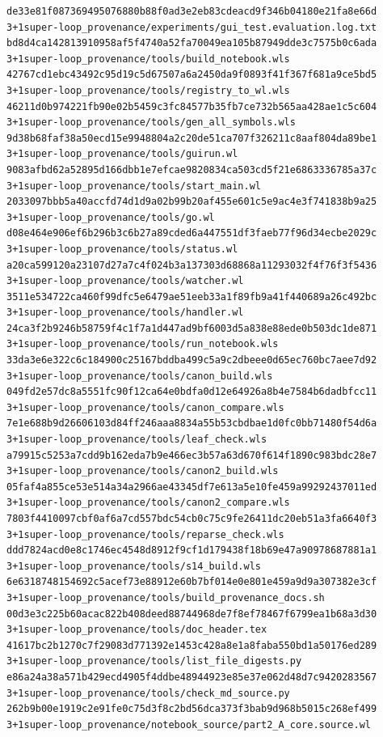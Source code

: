 \documentclass[
  10pt,
]{article}
\begin{document}
\begin{verbatim}
de33e81f087369495076880b88f0ad3e2eb83cdeacd9f346b04180e21fa8e66d  3+1super-loop_provenance/experiments/gui_test.evaluation.log.txt
bd8d4ca142813910958af5f4740a52fa70049ea105b87949dde3c7575b0c6ada  3+1super-loop_provenance/tools/build_notebook.wls
42767cd1ebc43492c95d19c5d67507a6a2450da9f0893f41f367f681a9ce5bd5  3+1super-loop_provenance/tools/registry_to_wl.wls
46211d0b974221fb90e02b5459c3fc84577b35fb7ce732b565aa428ae1c5c604  3+1super-loop_provenance/tools/gen_all_symbols.wls
9d38b68faf38a50ecd15e9948804a2c20de51ca707f326211c8aaf804da89be1  3+1super-loop_provenance/tools/guirun.wl
9083afbd62a52895d166dbb1e7efcae9820834ca503cd5f21e6863336785a37c  3+1super-loop_provenance/tools/start_main.wl
2033097bbb5a40accfd74d1d9a02b99b20af455e601c5e9ac4e3f741838b9a25  3+1super-loop_provenance/tools/go.wl
d08e464e906ef6b296b3c6b27a89cded6a447551df3faeb77f96d34ecbe2029c  3+1super-loop_provenance/tools/status.wl
a20ca599120a23107d27a7c4f024b3a137303d68868a11293032f4f76f3f5436  3+1super-loop_provenance/tools/watcher.wl
3511e534722ca460f99dfc5e6479ae51eeb33a1f89fb9a41f440689a26c492bc  3+1super-loop_provenance/tools/handler.wl
24ca3f2b9246b58759f4c1f7a1d447ad9bf6003d5a838e88ede0b503dc1de871  3+1super-loop_provenance/tools/run_notebook.wls
33da3e6e322c6c184900c25167bddba499c5a9c2dbeee0d65ec760bc7aee7d92  3+1super-loop_provenance/tools/canon_build.wls
049fd2e57dc8a5551fc90f12ca64e0bdfa0d12e64926a8b4e7584b6dadbfcc11  3+1super-loop_provenance/tools/canon_compare.wls
7e1e688b9d26606103d84ff246aaa8834a55b53cbdbae1d0fc0bb71480f54d6a  3+1super-loop_provenance/tools/leaf_check.wls
a79915c5253a7cdd9b162eda7b9e466ec3b57a63d670f614f1890c983bdc28e7  3+1super-loop_provenance/tools/canon2_build.wls
05faf4a855ce53e514a34a2966ae43345df7e613a5e10fe459a99292437011ed  3+1super-loop_provenance/tools/canon2_compare.wls
7803f4410097cbf0af6a7cd557bdc54cb0c75c9fe26411dc20eb51a3fa6640f3  3+1super-loop_provenance/tools/reparse_check.wls
ddd7824acd0e8c1746ec4548d8912f9cf1d179438f18b69e47a90978687881a1  3+1super-loop_provenance/tools/s14_build.wls
6e6318748154692c5acef73e88912e60b7bf014e0e801e459a9d9a307382e3cf  3+1super-loop_provenance/tools/build_provenance_docs.sh
00d3e3c225b60acac822b408deed88744968de7f8ef78467f6799ea1b68a3d30  3+1super-loop_provenance/tools/doc_header.tex
41617bc2b1270c7f29083d771392e1453c428a8e1a8faba550bd1a50176ed289  3+1super-loop_provenance/tools/list_file_digests.py
e86a24a38a571b429ecd4905f4ddbe48944923e85e37e062d48d7c9420283567  3+1super-loop_provenance/tools/check_md_source.py
262b9b00e1919c2e91fe0c75d3f8c2bd56dca373f3bab9d968b5015c268ef499  3+1super-loop_provenance/notebook_source/part2_A_core.source.wl

\end{verbatim}
\end{document}
